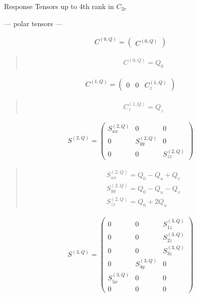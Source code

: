 \documentclass[fleqn,10pt]{jsarticle}
\begin{document}
\setcounter{MaxMatrixCols}{16}

\begin{center}
\LARGE
Response Tensors up to 4th rank in $C_{2v}$
\end{center}
\begin{center}\LARGE --- polar tensors ---\end{center}
\begin{align*}
C^{(0,Q)} = \begin{pmatrix} C^{(0,Q)} \end{pmatrix}
\end{align*}
\begin{quote}
\begin{align*}
& C^{(0,Q)} = Q_{0}
\end{align*}
\end{quote}
\begin{align*}
C^{(1,Q)} = \begin{pmatrix} 0 & 0 & C^{(1,Q)}_{z} \end{pmatrix}
\end{align*}
\begin{quote}
\begin{align*}
& C^{(1,Q)}_{z} = Q_{z}
\end{align*}
\end{quote}
\begin{align*}
S^{(2,Q)} = \begin{pmatrix} S^{(2,Q)}_{xx} & 0 & 0 \\ 0 & S^{(2,Q)}_{yy} & 0 \\ 0 & 0 & S^{(2,Q)}_{zz} \end{pmatrix}
\end{align*}
\begin{quote}
\begin{align*}
& S^{(2,Q)}_{xx} = Q_{0} - Q_{u} + Q_{v} \\
& S^{(2,Q)}_{yy} = Q_{0} - Q_{u} - Q_{v} \\
& S^{(2,Q)}_{zz} = Q_{0} + 2 Q_{u}
\end{align*}
\end{quote}
\begin{align*}
S^{(3,Q)} = \begin{pmatrix} 0 & 0 & S^{(3,Q)}_{1z} \\ 0 & 0 & S^{(3,Q)}_{2z} \\ 0 & 0 & S^{(3,Q)}_{3z} \\ 0 & S^{(3,Q)}_{4y} & 0 \\ S^{(3,Q)}_{5x} & 0 & 0 \\ 0 & 0 & 0 \end{pmatrix}
\end{align*}
\end{document}
